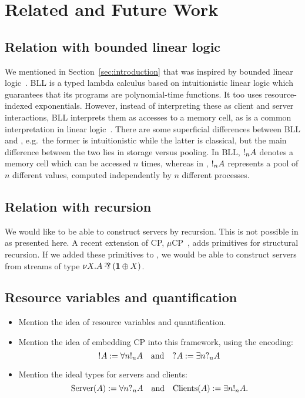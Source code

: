 \documentclass[a4paper,UKenglish]{lipics-v2016}
\begin{document}
\section{Related and Future Work}
\label{sec:conclusion}

\subsection*{Relation with bounded linear logic}
We mentioned in Section~\ref{sec:introduction} that \nodcap was inspired by
bounded linear logic~\cite[BLL]{girard1992}. BLL is a typed lambda calculus
based on intuitionistic linear logic which guarantees that its programs are
polynomial-time functions.
It too uses resource-indexed exponentials. However, instead of interpreting
these as client and server interactions, BLL interprets them as accesses to a
memory cell, as is a common interpretation in linear logic~\cite{girard1987}.
There are some superficial differences between BLL and \nodcap, e.g.\ the former
is intuitionistic while the latter is classical, but the main difference between
the two lies in storage versus pooling. In BLL, $\take[n]{A}$ denotes a memory
cell which can be accessed $n$ times, whereas in \nodcap, $\take[n]{A}$
represents a pool of $n$ different values, computed independently by $n$
different processes.

\subsection*{Relation with recursion}
We would like to be able to construct servers by recursion. This is not possible
in \nodcap as presented here.
A recent extension of CP, $\mu\text{CP}$~\cite{lindley2016}, adds primitives for
structural recursion.
If we added these primitives to \nodcap, we would be able to construct servers
from streams of type $\nu X.A \parr (\one \plus X)$.

\subsection*{ Resource variables and quantification}
\begin{itemize}
\item
  Mention the idea of resource variables and quantification.
\item
  Mention the idea of embedding CP into this framework, using the encoding:
  \[
    \take{A} := \forall{n}\take[n]{A}
    \quad\text{and}\quad
    \give{A} := \exists{n}{\give[n]{A}}
  \]
\item
  Mention the ideal types for servers and clients:
  \[
    \text{Server}(A) := \forall{n}\give[n]{A}
    \quad\text{and}\quad
    \text{Clients}(A) := \exists{n}{\take[n]{A}}.
  \]
\end{itemize}

\clearpage

\end{document}
